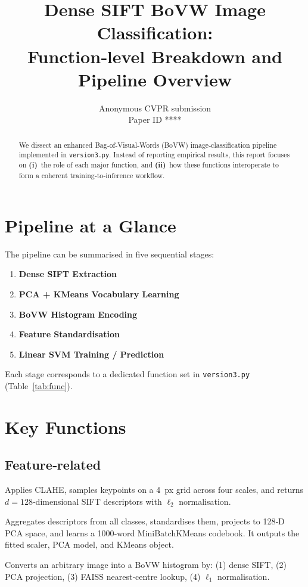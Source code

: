 \documentclass[10pt,twocolumn,letterpaper]{article}
\begin{document}
\title{Dense SIFT BoVW Image Classification:\\Function‑level Breakdown and Pipeline Overview}

\author{Anonymous CVPR submission\\Paper ID ****}
\maketitle

\begin{abstract}
We dissect an enhanced Bag‑of‑Visual‑Words (BoVW) image‑classification pipeline implemented in \texttt{version3.py}. Instead of reporting empirical results, this report focuses on \textbf{(i)}~the role of each major function, and \textbf{(ii)}~how these functions interoperate to form a coherent training‑to‑inference workflow.
\end{abstract}

\section{Pipeline at a Glance}
The pipeline can be summarised in five sequential stages:
\begin{enumerate}[leftmargin=*]
  \item \textbf{Dense SIFT Extraction}
  \item \textbf{PCA + KMeans Vocabulary Learning}
  \item \textbf{BoVW Histogram Encoding}
  \item \textbf{Feature Standardisation}
  \item \textbf{Linear SVM Training / Prediction}
\end{enumerate}
Each stage corresponds to a dedicated function set in \texttt{version3.py} (Table~\ref{tab:func}).

\section{Key Functions}
\subsection{Feature‑related}
\begin{description}[leftmargin=*]
  \item[\texttt{extract\_dense\_sift(img)}] Applies CLAHE, samples keypoints on a \SI{4}{px} grid across four scales, and returns $d=128$‑dimensional SIFT descriptors with $\ell_2$ normalisation.
  \item[\texttt{build\_vocabulary(training\_dir,\dots)}] Aggregates descriptors from all classes, standardises them, projects to 128‑D PCA space, and learns a \num{1000}‑word MiniBatchKMeans codebook. It outputs the fitted scaler, PCA model, and KMeans object.
  \item[\texttt{extract\_bow\_features(img, scaler, pca, vocab)}] Converts an arbitrary image into a BoVW histogram by: (1) dense SIFT, (2) PCA projection, (3) FAISS nearest‑centre lookup, (4) $\ell_1$ normalisation.
\end{description}
\end{document}
